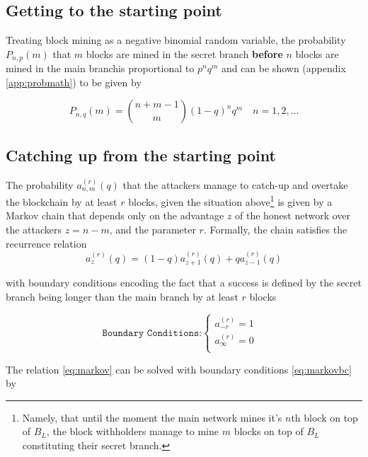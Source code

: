 \documentclass[letterpaper,12pt]{report}
\theoremstyle{plain}
\theoremstyle{definition}
\begin{document}
\subsection{Getting to the starting point}
Treating block mining as a negative binomial random variable, the probability $\mathit{P_{n,p}(m)}$ that $m$ blocks are mined in the secret branch {\bf before} $n$ blocks are mined in the main branchis proportional to $p^nq^m$ and can be shown
(appendix \ref{app:probmath}) to be given by

\begin{equation}\label{eq:pnm}
\mathit{P}_{n,q}(m)={n + m -1\choose m}(1-q)^nq^m \quad n=1,2,\dots
\end{equation}

\subsection{Catching up from the starting point}
The probability $\mathit{a}_{n,m}^{(r)}(q)$ that the attackers manage to catch-up and overtake the blockchain by at least $r$ blocks, given the situation above\footnote{Namely, that until the moment the main network mines it's $n$th block on top of $\mathit{B}_L$, the block withholders manage to mine $m$ blocks on top of $\mathit{B}_L$ constituting their secret branch.} is given by a Markov chain that depends only on the advantage $z$ of the honest network over the attackers $z=n-m$, and the parameter $r$. Formally, the chain satisfies the recurrence relation
\begin{equation}\label{eq:markov}
\mathit{a}^{(r)}_z(q)=(1-q)\mathit{a}^{(r)}_{z+1}(q)+q\mathit{a}^{(r)}_{z-1}(q)
\end{equation}

with boundary conditions encoding the fact that a success is defined by the secret branch being longer than the main branch by at least $r$ blocks

\begin{equation}\label{eq:markovbc}
\texttt{Boundary Conditions:}
\begin{cases}
\mathit{a}^{(r)}_{-r}=1 & \\ 
\mathit{a}^{(r)}_{\infty}=0 & \\
\end{cases}
\end{equation}



The relation \ref{eq:markov} can be solved with boundary conditions \ref{eq:markovbc} by 
\end{document}
